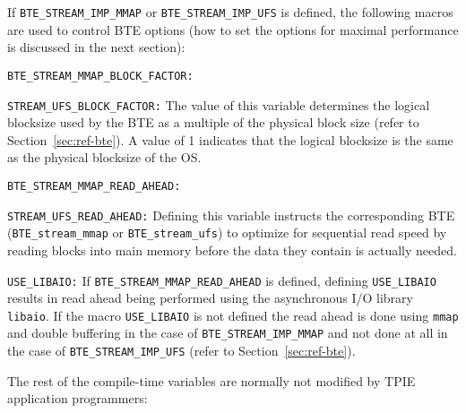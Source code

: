 \noindent
If \lstinline|BTE_STREAM_IMP_MMAP| or \lstinline|BTE_STREAM_IMP_UFS|
is defined, the following macros are used to control BTE options (how
to set the options for maximal performance is discussed in the next
section):

\begin{description}
  
\item\lstinline|BTE_STREAM_MMAP_BLOCK_FACTOR:|
\item\lstinline|STREAM_UFS_BLOCK_FACTOR:| The value of this
  variable determines the logical blocksize used by the BTE as a
  multiple of the physical block size (refer to
  Section~\ref{sec:ref-bte}). A value of 1 indicates that the logical
  blocksize is the same as the physical blocksize of the OS.

\item\lstinline|BTE_STREAM_MMAP_READ_AHEAD:| 
\item\lstinline|STREAM_UFS_READ_AHEAD:| Defining this variable
  instructs the corresponding BTE (\lstinline|BTE_stream_mmap| or
  \lstinline|BTE_stream_ufs|) to optimize for sequential read speed by
  reading blocks into main memory before the data they contain is
  actually needed.  
  
\item\lstinline|USE_LIBAIO:| If \lstinline|BTE_STREAM_MMAP_READ_AHEAD|
  is defined, defining \lstinline|USE_LIBAIO| results in read ahead
  being performed using the asynchronous I/O library
  \lstinline|libaio|. If the macro \lstinline|USE_LIBAIO| is not
  defined the read ahead is done using \lstinline|mmap| and double
  buffering in the case of \lstinline|BTE_STREAM_IMP_MMAP| and not
  done at all in the case of \lstinline|BTE_STREAM_IMP_UFS| (refer to
  Section~\ref{sec:ref-bte}).  
\end{description}

\noindent
The rest of the compile-time variables are normally not modified by
TPIE application programmers:

